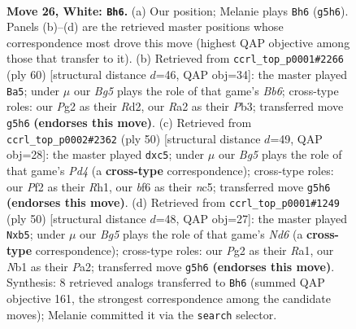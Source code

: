 \documentclass[11pt]{article}
\begin{document}
\clearpage

\begin{figure}[p]\centering
\begin{subfigure}{0.46\textwidth}\centering
\resizebox{\linewidth}{!}{%
\newchessgame
\chessboard[
  setfen={rn6/5k2/2p2b2/4p1B1/p6p/P7/RPP2PPP/1N2K3 w - - 1 26},
  showmover=false,
  pgfstyle=straightmove, color=movearrow, markmove={g5-h6}
]}
\caption{}
\end{subfigure}\hfill
\begin{subfigure}{0.46\textwidth}\centering
\resizebox{\linewidth}{!}{%
\newchessgame
\chessboard[
  setfen={8/1r1nbk1p/1B6/2p3p1/NpP5/1P5P/P2R1PK1/8 w - - 2 31},
  showmover=false,
  pgfstyle=straightmove, color=movearrow, markmove={b6-a5}
]}
\caption{}
\end{subfigure}
\\[4pt]
\begin{subfigure}{0.46\textwidth}\centering
\resizebox{\linewidth}{!}{%
\newchessgame
\chessboard[
  setfen={4kb2/2B3rp/2p1p3/2n4P/3P2p1/3BPp2/1P3P2/4K2R w - - 0 26},
  showmover=false,
  pgfstyle=straightmove, color=movearrow, markmove={d4-c5}
]}
\caption{}
\end{subfigure}\hfill
\begin{subfigure}{0.46\textwidth}\centering
\resizebox{\linewidth}{!}{%
\newchessgame
\chessboard[
  setfen={6k1/p5p1/1n1Nr2p/1b1p4/1p1P4/5PP1/PP5P/R5K1 w - - 0 26},
  showmover=false,
  pgfstyle=straightmove, color=movearrow, markmove={d6-b5}
]}
\caption{}
\end{subfigure}
\caption{\textbf{Move 26, White: \texttt{Bh6}.} (a) Our position; Melanie plays \texttt{Bh6} (\texttt{g5h6}). Panels (b)--(d) are the retrieved master positions whose correspondence most drove this move (highest QAP objective among those that transfer to it). (b) Retrieved from \texttt{ccrl\_top\_p0001\#2266} (ply 60) [structural distance $d$=46, QAP obj=34]: the master played \texttt{Ba5}; under $\mu$ our \emph{Bg5} plays the role of that game's \emph{Bb6}; cross-type roles: our \emph{P}g2 as their \emph{R}d2, our \emph{R}a2 as their \emph{P}b3; transferred move \texttt{g5h6} \textbf{(endorses this move)}. (c) Retrieved from \texttt{ccrl\_top\_p0002\#2362} (ply 50) [structural distance $d$=49, QAP obj=28]: the master played \texttt{dxc5}; under $\mu$ our \emph{Bg5} plays the role of that game's \emph{Pd4} (a \textbf{cross-type} correspondence); cross-type roles: our \emph{P}f2 as their \emph{R}h1, our \emph{b}f6 as their \emph{n}c5; transferred move \texttt{g5h6} \textbf{(endorses this move)}. (d) Retrieved from \texttt{ccrl\_top\_p0001\#1249} (ply 50) [structural distance $d$=48, QAP obj=27]: the master played \texttt{Nxb5}; under $\mu$ our \emph{Bg5} plays the role of that game's \emph{Nd6} (a \textbf{cross-type} correspondence); cross-type roles: our \emph{P}g2 as their \emph{R}a1, our \emph{N}b1 as their \emph{P}a2; transferred move \texttt{g5h6} \textbf{(endorses this move)}. Synthesis: 8 retrieved analogs transferred to \texttt{Bh6} (summed QAP objective 161, the strongest correspondence among the candidate moves); Melanie committed it via the \texttt{search} selector.}
\label{fig:thought-m50}
\end{figure}
\end{document}
